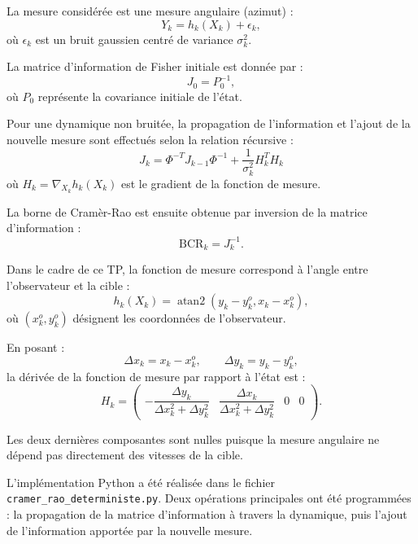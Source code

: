 \documentclass[12pt,a4paper]{article}
\begin{document}
La mesure considérée est une mesure angulaire (azimut) :
\begin{equation}
Y_k = h_k(X_k)+\epsilon_k,
\end{equation}
où $\epsilon_k$ est un bruit gaussien centré de variance $\sigma_k^2$.

La matrice d'information de Fisher initiale est donnée par :
\begin{equation}
J_0=P_0^{-1},
\end{equation}
où $P_0$ représente la covariance initiale de l'état.

Pour une dynamique non bruitée, la propagation de l'information et l'ajout de la nouvelle mesure sont effectués selon la relation récursive :
\begin{equation}
\boxed{
J_k =
\Phi^{-T}J_{k-1}\Phi^{-1}
+
\frac{1}{\sigma_k^2}
H_k^T H_k
}
\end{equation}
où $H_k=\nabla_{X_k}h_k(X_k)$ est le gradient de la fonction de mesure.

La borne de Cramèr-Rao est ensuite obtenue par inversion de la matrice d'information :
\begin{equation}
\boxed{\mathrm{BCR}_k=J_k^{-1}.}
\end{equation}

Dans le cadre de ce TP, la fonction de mesure correspond à l'angle entre l'observateur et la cible :
\begin{equation}
h_k(X_k)=
\operatorname{atan2}
(y_k-y_k^o,x_k-x_k^o),
\end{equation}
où $(x_k^o,y_k^o)$ désignent les coordonnées de l'observateur.

En posant :
\begin{equation}
\Delta x_k=x_k-x_k^o,\qquad
\Delta y_k=y_k-y_k^o,
\end{equation}
la dérivée de la fonction de mesure par rapport à l'état est :
\begin{equation}
H_k =
\begin{pmatrix}
-\dfrac{\Delta y_k}{\Delta x_k^2+\Delta y_k^2}
&
\dfrac{\Delta x_k}{\Delta x_k^2+\Delta y_k^2}
&
0&0
\end{pmatrix}.
\end{equation}

Les deux dernières composantes sont nulles puisque la mesure angulaire ne dépend pas directement des vitesses de la cible.

L'implémentation Python a été réalisée dans le fichier \texttt{cramer\_rao\_deterministe.py}. Deux opérations principales ont été programmées : la propagation de la matrice d'information à travers la dynamique, puis l'ajout de l'information apportée par la nouvelle mesure.
\end{document}
